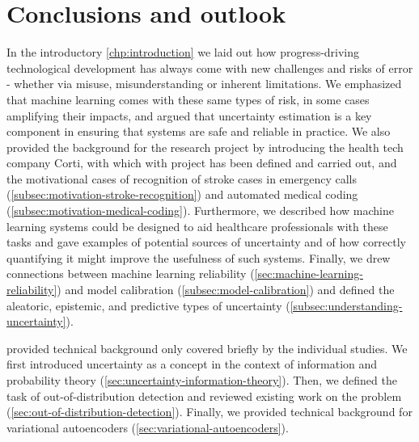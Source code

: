 
\chapter[conclusions and outlook]{Conclusions and outlook}\label{chp:conclusion}

In the introductory \cref{chp:introduction} we laid out how progress-driving technological development has always come with new challenges and risks of error - whether via misuse, misunderstanding or inherent limitations. We emphasized that machine learning comes with these same types of risk, in some cases amplifying their impacts, and argued that uncertainty estimation is a key component in ensuring that systems are safe and reliable in practice. We also provided the background for the research project by introducing the health tech company Corti, with which with project has been defined and carried out, and the motivational cases of recognition of stroke cases in emergency calls (\cref{subsec:motivation-stroke-recognition}) and automated medical coding (\cref{subsec:motivation-medical-coding}). Furthermore, we described how machine learning systems could be designed to aid healthcare professionals with these tasks and gave examples of potential sources of uncertainty and of how correctly quantifying it might improve the usefulness of such systems. Finally, we drew connections between machine learning reliability (\cref{sec:machine-learning-reliability}) and model calibration (\cref{subsec:model-calibration}) and defined the aleatoric, epistemic, and predictive types of uncertainty (\cref{subsec:understanding-uncertainty}).

\vspace{3em}
\textbf{} provided technical background only covered briefly by the individual studies. We first introduced uncertainty as a concept in the context of information and probability theory (\cref{sec:uncertainty-information-theory}). Then, we defined the task of out-of-distribution detection and reviewed existing work on the problem (\cref{sec:out-of-distribution-detection}). Finally, we provided technical background for variational autoencoders (\cref{sec:variational-autoencoders}).

